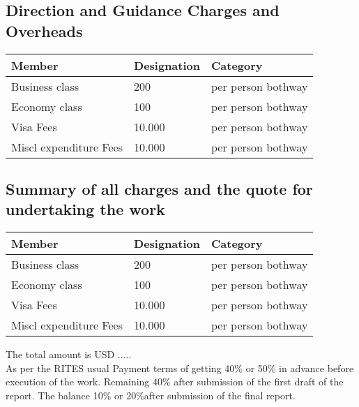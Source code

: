 \documentclass[12pt,a4paper]{article} %
\begin{document}
\subsection{Direction and Guidance Charges and Overheads }

\par\vspace{\baselineskip}

\begin{tabular}{|l||l|l|}
\hline
Member & Designation & Category \\
\hline
Business class & 200 & per person bothway \\
Economy  class & 100 & per person bothway \\
Visa Fees & 10.000 & per person bothway \\
Miscl expenditure  Fees & 10.000 & per person bothway \\
\hline
\end{tabular}

\subsection{Summary of all charges and the quote for undertaking the work }

\par\vspace{\baselineskip}

\begin{tabular}{|l||l|l|}
\hline
Member & Designation & Category \\
\hline
Business class & 200 & per person bothway \\
Economy  class & 100 & per person bothway \\
Visa Fees & 10.000 & per person bothway \\
Miscl expenditure  Fees & 10.000 & per person bothway \\
\hline
\end{tabular}
The total amount is USD .....  \\
As per the RITES usual Payment terms of getting 40\% or 50\% in advance before execution of the work.
Remaining 40\% after submission of the first draft of the report.
The balance 10\% or 20\%after submission of the final report.
\end{document}
